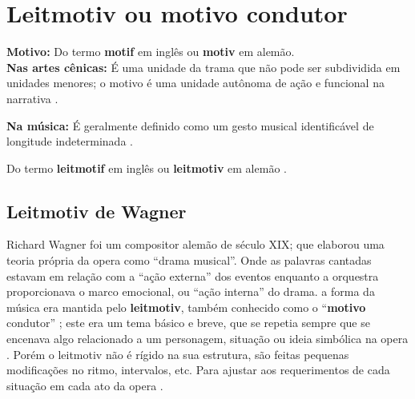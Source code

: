 
\newpage
\section{Leitmotiv ou motivo condutor}
\label{sec:leitmotivdanca}

\begin{tcbinformation} 
\textbf{Motivo:}
Do termo \textbf{motif} em inglês ou  \textbf{motiv}  em alemão.\\

\textbf{Nas artes cênicas:}
É uma unidade da trama que não pode ser subdividida em unidades menores;
o motivo é uma unidade autônoma de ação e funcional na narrativa \cite[pp. 221]{pavis1998dictionary}.

\textbf{Na música:}
É geralmente definido como um gesto musical identificável de longitude indeterminada \cite[pp. 123]{powrie2006changing}.

\end{tcbinformation}


\begin{notation}
Do termo \textbf{leitmotif} em inglês ou  \textbf{leitmotiv}  em alemão \cite[pp. 7]{bribitzer2015understanding}.
\end{notation}



\subsection{Leitmotiv de Wagner}
\label{subsec:LeitmotivDeWagner}

Richard Wagner foi um compositor alemão de século XIX; 
que elaborou uma teoria própria da opera como ``drama musical''.
Onde as palavras cantadas estavam em relação com a ``ação externa'' dos eventos
enquanto a orquestra proporcionava o marco emocional, ou ``ação interna'' do drama.
a forma da música era mantida pelo \textbf{leitmotiv}, 
também conhecido como o ``\textbf{motivo} condutor'' \cite[pp. 229-230]{holst1998abc};
este era um tema básico e breve, 
que se repetia sempre que se encenava algo relacionado a um personagem, 
situação ou ideia simbólica na opera \cite[pp. 229-230]{holst1998abc} \cite[pp. 465-466]{apel1969harvard}.
Porém o leitmotiv não é rígido na sua estrutura, são feitas pequenas modificações no ritmo, intervalos, etc.
Para ajustar aos requerimentos de cada situação em cada ato da opera \cite[pp. 466]{apel1969harvard}.

